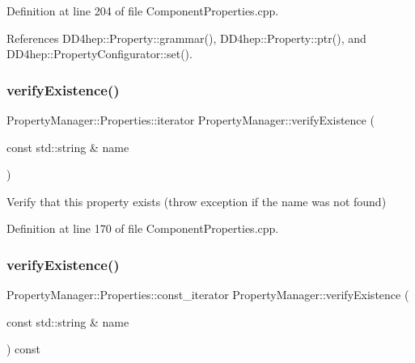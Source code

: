 Definition at line 204 of file Component\+Properties.\+cpp.



References D\+D4hep\+::\+Property\+::grammar(), D\+D4hep\+::\+Property\+::ptr(), and D\+D4hep\+::\+Property\+Configurator\+::set().

\hypertarget{class_d_d4hep_1_1_property_manager_a7a616dc476e887cb58420916af7d22a0}{}\label{class_d_d4hep_1_1_property_manager_a7a616dc476e887cb58420916af7d22a0} 
\subsubsection{\texorpdfstring{verify\+Existence()}{verifyExistence()}\hspace{0.1cm}{\footnotesize\ttfamily [1/2]}}
{\footnotesize\ttfamily Property\+Manager\+::\+Properties\+::iterator Property\+Manager\+::verify\+Existence (\begin{DoxyParamCaption}\item[{const std\+::string \&}]{name }\end{DoxyParamCaption})\hspace{0.3cm}{\ttfamily [protected]}}



Verify that this property exists (throw exception if the name was not found) 



Definition at line 170 of file Component\+Properties.\+cpp.

\hypertarget{class_d_d4hep_1_1_property_manager_ae9ff33ccd648dec359cf4e0d3951b167}{}\label{class_d_d4hep_1_1_property_manager_ae9ff33ccd648dec359cf4e0d3951b167} 
\subsubsection{\texorpdfstring{verify\+Existence()}{verifyExistence()}\hspace{0.1cm}{\footnotesize\ttfamily [2/2]}}
{\footnotesize\ttfamily Property\+Manager\+::\+Properties\+::const\+\_\+iterator Property\+Manager\+::verify\+Existence (\begin{DoxyParamCaption}\item[{const std\+::string \&}]{name }\end{DoxyParamCaption}) const\hspace{0.3cm}{\ttfamily [protected]}}




